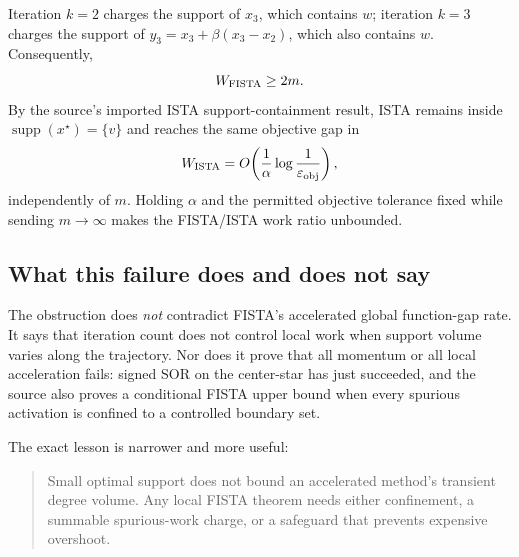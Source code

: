 Iteration $k=2$ charges the support of $x_3$, which contains $w$; iteration
$k=3$ charges the support of
$y_3=x_3+\beta(x_3-x_2)$, which also contains $w$.  Consequently,
\begin{equation}
  W_{\rm FISTA}\ge2m.
  \label{eq:signed-star-fista-work-lower}
\end{equation}
By the source's imported ISTA support-containment result, ISTA remains inside
$\operatorname{supp}(x^\star)=\{v\}$ and reaches the same objective gap in
\begin{equation}
  W_{\rm ISTA}
  =O\!\left(
      \frac1\alpha\log\frac1{\varepsilon_{\rm obj}}
    \right),
  \label{eq:signed-star-ista-work-upper}
\end{equation}
independently of $m$.  Holding $\alpha$ and the permitted objective tolerance
fixed while sending $m\to\infty$ makes the FISTA/ISTA work ratio unbounded.

\subsection{What this failure does and does not say}

The obstruction does \emph{not} contradict FISTA's accelerated global
function-gap rate.  It says that iteration count does not control local work
when support volume varies along the trajectory.  Nor does it prove that all
momentum or all local acceleration fails: signed SOR on the center-star has
just succeeded, and the source also proves a conditional FISTA upper bound
when every spurious activation is confined to a controlled boundary set.

The exact lesson is narrower and more useful:
\begin{quote}
Small optimal support does not bound an accelerated method's transient
degree volume.  Any local FISTA theorem needs either confinement, a summable
spurious-work charge, or a safeguard that prevents expensive overshoot.
\end{quote}
